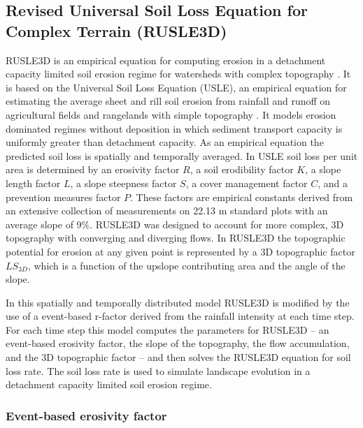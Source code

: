 \documentclass[gmd, manuscript]{copernicus}
\begin{document}
\subsection{Revised Universal Soil Loss Equation for Complex Terrain (RUSLE3D)}
\label{rusle_model}
RUSLE3D
is an empirical equation for computing erosion 
in a detachment capacity limited soil erosion regime
for watersheds with complex topography \citep{Mitasova1996}. 
It is based on 
the Universal Soil Loss Equation (USLE),
an empirical equation for estimating the average
sheet and rill soil erosion from rainfall and runoff
on agricultural fields and rangelands with simple topography 
\citep{Wischmeier1978}. 
It models erosion dominated regimes without deposition
in which sediment transport capacity is 
uniformly greater than detachment capacity.
As an empirical equation the predicted soil loss 
is spatially and temporally averaged. 
In USLE soil loss per unit area is determined by 
an erosivity factor $R$,
a soil erodibility factor $K$, 
a slope length factor $L$,
a slope steepness factor $S$,
a cover management factor $C$,
and a prevention measures factor $P$.
These factors are empirical constants derived 
from an extensive collection of measurements 
on 22.13 \unit{m} standard plots with an average slope of 9$\%$.  
RUSLE3D was designed to account for more complex, 3D topography 
with converging and diverging flows. 
In RUSLE3D the topographic potential for erosion at any given point 
is represented by a 3D topographic factor $LS_{3D}$,
which is a function of the upslope contributing area 
and the angle of the slope. 

In this spatially and temporally distributed model 
RUSLE3D is modified by the use of a 
event-based r-factor derived from the rainfall intensity 
at each time step.
For each time step
this model computes the parameters for RUSLE3D -- 
an event-based erosivity factor,
the slope of the topography, the flow accumulation, and
the 3D topographic factor -- and then
solves the RUSLE3D equation for soil loss rate. 
The soil loss rate is used to simulate landscape evolution 
in a detachment capacity limited soil erosion regime.



\subsubsection{Event-based erosivity factor}
\end{document}
